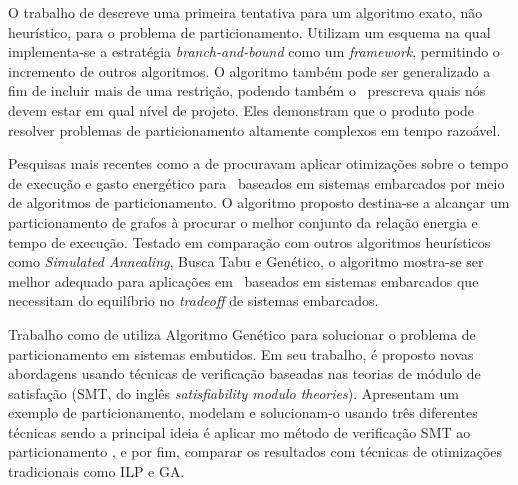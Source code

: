    O trabalho de \cite{Mann2007} descreve uma primeira tentativa para um algoritmo exato, não heurístico, para o problema de particionamento.
   Utilizam um esquema na qual implementa-se a estratégia \textit{branch-and-bound} como um \textit{framework}, permitindo o incremento de outros algoritmos.
   O algoritmo também pode ser generalizado a fim de incluir mais de uma restrição, podendo também o \designer\ prescreva quais nós devem estar em qual nível de projeto.
   Eles demonstram que o produto pode resolver problemas de particionamento altamente complexos em tempo razoável.

   Pesquisas mais recentes como a de \cite{Hassine2017} procuravam aplicar otimizações sobre o tempo de execução e gasto energético para \cores\ baseados em sistemas embarcados por meio de algoritmos de particionamento.
   O algoritmo proposto destina-se a alcançar um particionamento de grafos à procurar o melhor conjunto da relação energia e tempo de execução.
   Testado em comparação com outros algoritmos heurísticos como \textit{Simulated Annealing}, Busca Tabu e Genético, o algoritmo mostra-se ser melhor adequado para aplicações em \cores\ baseados em sistemas embarcados que necessitam do equilíbrio no \textit{tradeoff} de sistemas embarcados.

   Trabalho como de \cite{Trindade2016} utiliza Algoritmo Genético para solucionar o problema de particionamento em sistemas embutidos.
   Em seu trabalho, é proposto novas abordagens usando técnicas de verificação baseadas nas teorias de módulo de satisfação (SMT, do inglês \textit{satisfiability modulo theories}).
   Apresentam um exemplo de particionamento, modelam e solucionam-o usando três diferentes técnicas sendo a principal ideia é aplicar mo método de verificação SMT ao particionamento \hs, e por fim, comparar os resultados com técnicas de otimizações tradicionais como ILP e GA.

